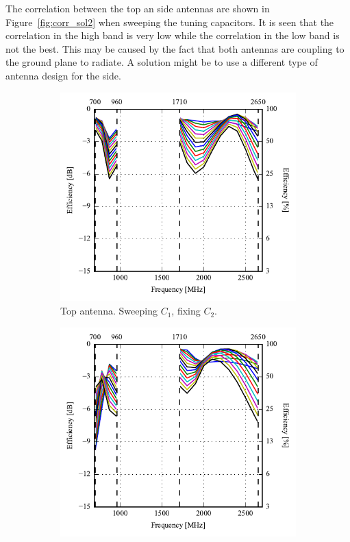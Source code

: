 The correlation between the top an side antennas are shown in Figure~\ref{fig:corr_sol2} when sweeping the tuning capacitors. It is seen that the correlation in the high band is very low while the correlation in the low band is not the best. This may be caused by the fact that both antennas are coupling to the ground plane to radiate. A solution might be to use a different type of antenna design for the side.

\begin{figure}[htbp]
    \centering
    \begin{subfigure}{0.49\linewidth}
        \centering
        \includegraphics{img/tech_sol/trianglefeed/efficiency-ac1-csh1.pdf}
        \caption{Top antenna. Sweeping $C_1$, fixing $C_2$.}
    \end{subfigure}
    \hfill
    \begin{subfigure}{0.49\linewidth}
        \centering
        \includegraphics{img/tech_sol/trianglefeed/efficiency-ac2-csh2.pdf}

\end{subfigure}
\end{figure}
